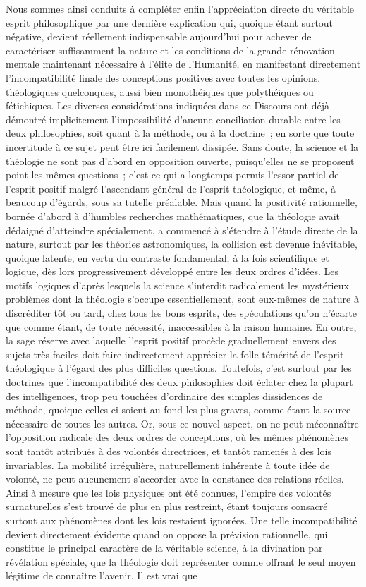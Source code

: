 \documentclass[french,twoside]{book} %
\begin{document}
Nous sommes ainsi conduits à compléter enfin l’appréciation directe du véritable esprit philosophique par une dernière explication qui, quoique étant surtout négative, devient réellement indispensable aujourd’hui pour achever de caractériser suffisamment la nature et les conditions de la grande rénovation mentale maintenant nécessaire à l’élite de l’Humanité, en manifestant directement l’incompatibilité finale des conceptions positives avec toutes les opinions. théologiques quelconques, aussi bien monothéiques que polythéiques ou fétichiques. Les diverses considérations indiquées dans ce Discours ont déjà démontré implicitement l’impossibilité d’aucune conciliation durable entre les deux philosophies, soit quant à la méthode, ou à la doctrine ; en sorte que toute incertitude à ce sujet peut être ici facilement dissipée. Sans doute, la science et la théologie ne sont pas d’abord en opposition ouverte, puisqu’elles ne se proposent point les mêmes questions ; c’est ce qui a longtemps permis l’essor partiel de l’esprit positif malgré l’ascendant général de l’esprit théologique, et même, à beaucoup d’égards, sous sa tutelle préalable. Mais quand la positivité rationnelle, bornée d’abord à d’humbles recherches mathématiques, que la théologie avait dédaigné d’atteindre spécialement, a commencé à s’étendre à l’étude directe de la nature, surtout par les théories astronomiques, la collision est devenue inévitable, quoique latente, en vertu du contraste fondamental, à la fois scientifique et logique, dès lors progressivement développé entre les deux ordres d’idées. Les motifs logiques d’après lesquels la science s’interdit radicalement les mystérieux problèmes dont la théologie s’occupe essentiellement, sont eux-mêmes de nature à discréditer tôt ou tard, chez tous les bons esprits, des spéculations qu’on n’écarte que comme étant, de toute nécessité, inaccessibles à la raison humaine. En outre, la sage réserve avec laquelle l’esprit positif procède graduellement envers des sujets très faciles doit faire indirectement apprécier la folle témérité de l’esprit théologique à l’égard des plus difficiles questions. Toutefois, c’est surtout par les doctrines que l’incompatibilité des deux philosophies doit éclater chez la plupart des intelligences, trop peu touchées d’ordinaire des simples dissidences de méthode, quoique celles-ci soient au fond les plus graves, comme étant la source nécessaire de toutes les autres. Or, sous ce nouvel aspect, on ne peut méconnaître l’opposition radicale des deux ordres de conceptions, où les mêmes phénomènes sont tantôt attribués à des volontés directrices, et tantôt ramenés à des lois invariables. La mobilité irrégulière, naturellement inhérente à toute idée de volonté, ne peut aucunement s’accorder avec la constance des relations réelles. Ainsi à mesure que les lois physiques ont été connues, l’empire des volontés surnaturelles s’est trouvé de plus en plus restreint, étant toujours consacré surtout aux phénomènes dont les lois restaient ignorées. Une telle incompatibilité devient directement évidente quand on oppose la prévision rationnelle, qui constitue le principal caractère de la véritable science, à la divination par révélation spéciale, que la théologie doit représenter comme offrant le seul moyen légitime de connaître l’avenir. Il est vrai que 
\end{document}
